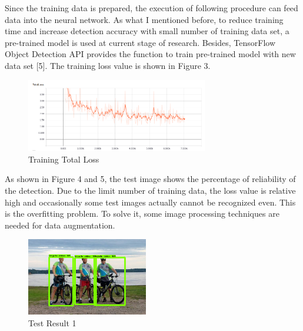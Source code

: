 \documentclass[titlepage]{article}
\begin{document}
Since the training data is prepared, the execution of following procedure can
feed data into the neural network. As what I mentioned before, to reduce
training time and increase detection accuracy with small number of training
data set, a pre-trained model is used at current stage of research. Besides,
TensorFlow Object Detection API provides the function to train pre-trained
model with new data set [5]. The training loss value is shown in Figure 3.

\begin{figure}[htbp]
\centering
\includegraphics[width=300]{total_loss.png}
\caption{Training Total Loss}
\end{figure}

As shown in Figure 4 and 5, the test image shows the percentage of reliability of
the detection. Due to the limit number of training data, the loss value is
relative high and occasionally some test images actually cannot be recognized
even. This is the overfitting problem. To solve it, some image processing
techniques are needed for data augmentation.

\begin{figure}[htbp]
\centering
\includegraphics[width=200]{test1.png}
\caption{Test Result 1}
\end{figure} 
\end{document}
